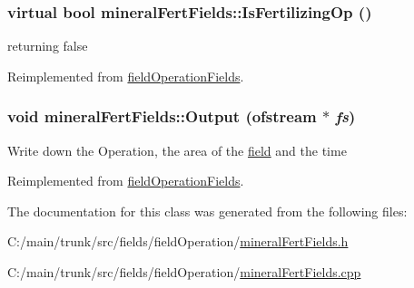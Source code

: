 \label{classmineral_fert_fields_a312491a593ff9258446d24704d833f5b}
\hypertarget{classmineral_fert_fields_a73b4d9ac6b06da725809f785a88edff1}{
\subsubsection[{IsFertilizingOp}]{\setlength{\rightskip}{0pt plus 5cm}virtual bool mineralFertFields::IsFertilizingOp ()}}
\label{classmineral_fert_fields_a73b4d9ac6b06da725809f785a88edff1}


returning false 

Reimplemented from \hyperlink{classfield_operation_fields_ae21a07b4ab147829465e5b79418708f7}{fieldOperationFields}.\hypertarget{classmineral_fert_fields_abbb016beaa3ec35d35a9ea0001c7b96c}{
\subsubsection[{Output}]{\setlength{\rightskip}{0pt plus 5cm}void mineralFertFields::Output (ofstream $\ast$ {\em fs})}}
\label{classmineral_fert_fields_abbb016beaa3ec35d35a9ea0001c7b96c}
Write down the Operation, the area of the \hyperlink{classfield}{field} and the time 

Reimplemented from \hyperlink{classfield_operation_fields_a8dff595b832bca540dda946639f7f47a}{fieldOperationFields}.

The documentation for this class was generated from the following files:\begin{DoxyCompactItemize}
\item 
C:/main/trunk/src/fields/fieldOperation/\hyperlink{mineral_fert_fields_8h}{mineralFertFields.h}\item 
C:/main/trunk/src/fields/fieldOperation/\hyperlink{mineral_fert_fields_8cpp}{mineralFertFields.cpp}\end{DoxyCompactItemize}
